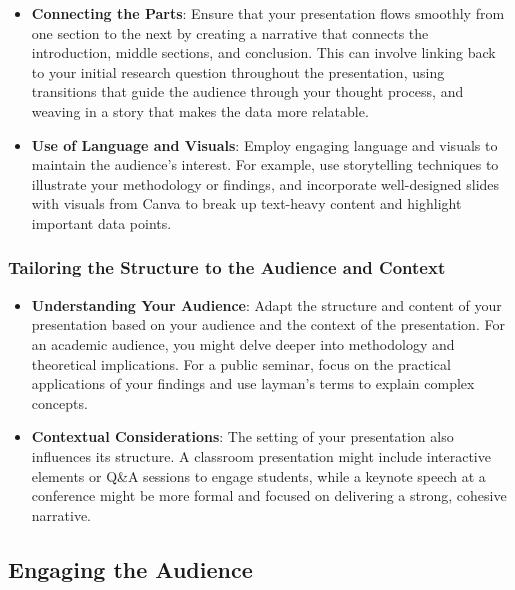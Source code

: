 \documentclass[
]{book}
\begin{document}
\begin{itemize}
\item
  \textbf{Connecting the Parts}: Ensure that your presentation flows smoothly from one section to the next by creating a narrative that connects the introduction, middle sections, and conclusion. This can involve linking back to your initial research question throughout the presentation, using transitions that guide the audience through your thought process, and weaving in a story that makes the data more relatable.
\item
  \textbf{Use of Language and Visuals}: Employ engaging language and visuals to maintain the audience's interest. For example, use storytelling techniques to illustrate your methodology or findings, and incorporate well-designed slides with visuals from Canva to break up text-heavy content and highlight important data points.
\end{itemize}

\hypertarget{tailoring-the-structure-to-the-audience-and-context}{%
\subsubsection*{Tailoring the Structure to the Audience and Context}\label{tailoring-the-structure-to-the-audience-and-context}}

\begin{itemize}
\item
  \textbf{Understanding Your Audience}: Adapt the structure and content of your presentation based on your audience and the context of the presentation. For an academic audience, you might delve deeper into methodology and theoretical implications. For a public seminar, focus on the practical applications of your findings and use layman's terms to explain complex concepts.
\item
  \textbf{Contextual Considerations}: The setting of your presentation also influences its structure. A classroom presentation might include interactive elements or Q\&A sessions to engage students, while a keynote speech at a conference might be more formal and focused on delivering a strong, cohesive narrative.
\end{itemize}

\hypertarget{engaging-the-audience}{%
\subsection*{Engaging the Audience}\label{engaging-the-audience}}
\end{document}
